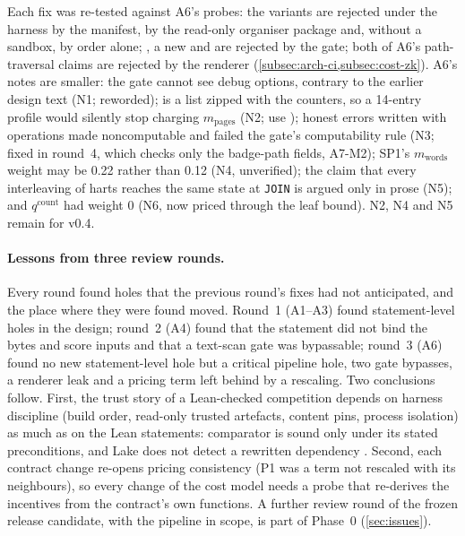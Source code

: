 Each fix was re-tested against A6's probes: the  variants are rejected under the
harness by the manifest, by the read-only organiser package and, without a sandbox, by order alone;
, a new  and  are rejected by the gate; both of A6's
path-traversal claims are rejected by the renderer (\cref{subsec:arch-ci,subsec:cost-zk}). A6's
notes are smaller: the gate cannot see debug options, contrary to the earlier design text (N1;
reworded);  is a list zipped with the counters, so a 14-entry profile would silently
stop charging $m_{\mathrm{pages}}$ (N2; use ); honest errors written with
 operations made  noncomputable and failed the gate's computability rule
(N3; fixed in round~4, which checks only the badge-path fields, A7-M2); SP1's $m_{\mathrm{words}}$ weight may be 0.22 rather than 0.12
(N4, unverified); the claim that every interleaving of harts reaches the same state at
\texttt{JOIN} is argued only in prose (N5); and $q^{\mathrm{count}}$ had weight 0 (N6, now priced
through the leaf bound). N2, N4 and N5 remain for v0.4.

\paragraph{Lessons from three review rounds.} Every round found holes that the previous round's fixes
had not anticipated, and the place where they were found moved. Round~1 (A1--A3) found statement-level
holes in the design; round~2 (A4) found that the statement did not bind the bytes and score inputs
and that a text-scan gate was bypassable; round~3 (A6) found no new statement-level hole but a
critical pipeline hole, two gate bypasses, a renderer leak and a pricing term left behind by a
rescaling. Two conclusions follow. First, the trust story of a Lean-checked competition depends on
harness discipline (build order, read-only trusted artefacts, content pins, process isolation) as
much as on the Lean statements: comparator is sound only under its stated preconditions, and Lake
does not detect a rewritten dependency . Second, each contract change re-opens pricing
consistency (P1 was a term not rescaled with its neighbours), so every change of the cost model needs
a probe that re-derives the incentives from the contract's own functions. A further review round of
the frozen release candidate, with the pipeline in scope, is part of Phase~0 (\cref{sec:issues}).

